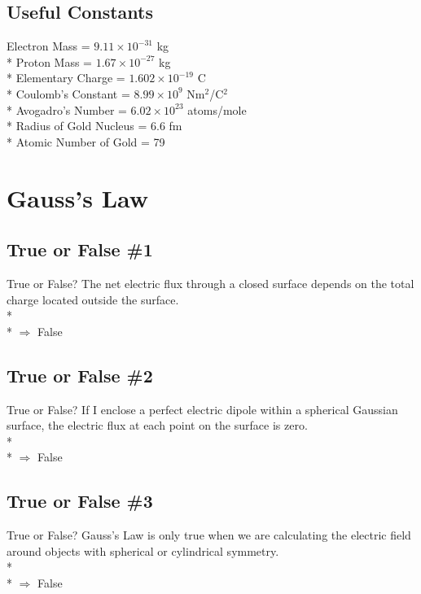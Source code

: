\documentclass[11pt]{article}
\begin{document}
\maketitle
\tableofcontents
\vspace{10pt}

\subsection*{Useful Constants}
Electron Mass = $9.11 \times 10^{-31}$ kg \\*
Proton Mass = $1.67 \times 10^{-27}$ kg \\*
Elementary Charge = $1.602 \times 10^{-19}$ C \\*
Coulomb's Constant = $8.99 \times 10^9$ Nm$^2$/C$^2$ \\*
Avogadro's Number = $ 6.02 \times 10^{23}$ atoms/mole \\*
Radius of Gold Nucleus = 6.6 fm \\*
Atomic Number of Gold = 79


\pagebreak
\section{Gauss's Law}
\vspace{10pt}

\subsection{True or False \#1}
True or False?  The net electric flux through a closed surface depends on the total charge located outside the surface.\\* \\*
$\Rightarrow$ False

\subsection{True or False \#2}
True or False?  If I enclose a perfect electric dipole within a spherical Gaussian surface, the electric flux at each point on the surface is zero.\\* \\*
$\Rightarrow$ False

\subsection{True or False \#3}
True or False?  Gauss's Law is only true when we are calculating the electric field around objects with spherical or cylindrical symmetry.\\* \\*
$\Rightarrow$ False
\end{document}
